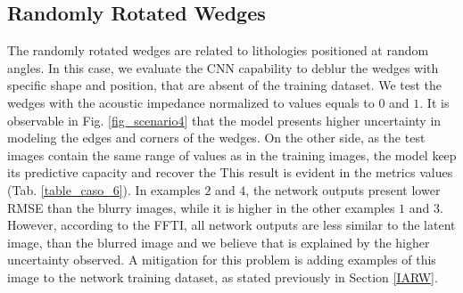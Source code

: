 \documentclass[conference]{IEEEtran}
\begin{document}
\subsection{Randomly Rotated Wedges}
The randomly rotated wedges are related to lithologies positioned at random angles.
In this case, we evaluate the CNN capability to deblur the wedges with specific shape and
position, that are absent of the training dataset.
We test the wedges with the acoustic impedance normalized to values equals to $0$ and $1$.
It is observable in Fig. \ref{fig_scenario4} that the model presents higher uncertainty
in modeling the edges and corners of the wedges. On the other side, as the test images contain the same range of values
as in the training images, the model keep its predictive capacity and recover the  This result is evident in the metrics values
(Tab. \ref{table_caso_6}). In examples $2$ and $4$, the network outputs present lower RMSE than the blurry images, 
while it is higher in the other examples $1$ and $3$. However, according to the FFTI, all network outputs are
less similar to the latent image, than the blurred image and we believe that is explained by the higher uncertainty
observed. A mitigation for this problem is adding examples of this image to the network training dataset, as stated previously in
Section \ref{IARW}.
\end{document}

